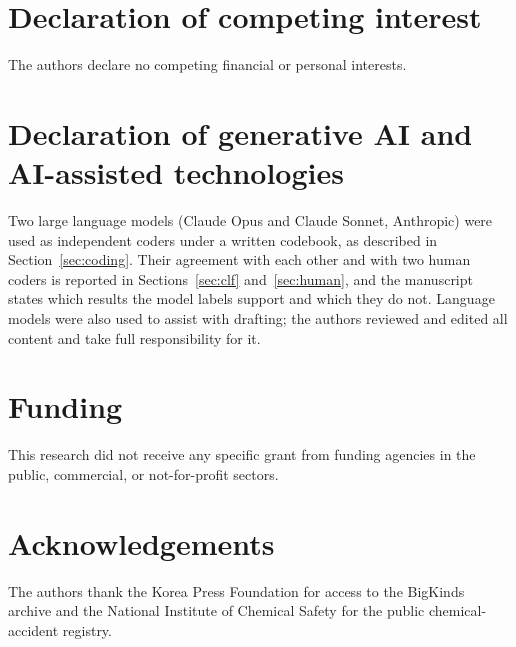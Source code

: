 \documentclass[1p,times]{elsarticle}
\begin{document}
\section*{Declaration of competing interest}
The authors declare no competing financial or personal interests.

\section*{Declaration of generative AI and AI-assisted technologies}
Two large language models (Claude Opus and Claude Sonnet, Anthropic) were used as independent coders under a written codebook, as described in Section~\ref{sec:coding}. Their agreement with each other and with two human coders is reported in Sections~\ref{sec:clf} and~\ref{sec:human}, and the manuscript states which results the model labels support and which they do not. Language models were also used to assist with drafting; the authors reviewed and edited all content and take full responsibility for it.

\section*{Funding}
This research did not receive any specific grant from funding agencies in the public, commercial, or not-for-profit sectors.

\section*{Acknowledgements}
The authors thank the Korea Press Foundation for access to the BigKinds archive and the National Institute of Chemical Safety for the public chemical-accident registry.
\end{document}
